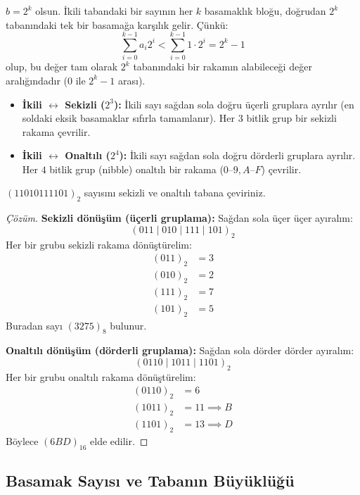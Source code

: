 $b = 2^k$ olsun. İkili tabandaki bir sayının her $k$ basamaklık bloğu, doğrudan $2^k$ tabanındaki tek bir basamağa karşılık gelir. Çünkü:
\[
\sum_{i=0}^{k-1} a_i 2^i < \sum_{i=0}^{k-1} 1 \cdot 2^i = 2^k - 1
\]
olup, bu değer tam olarak $2^k$ tabanındaki bir rakamın alabileceği değer aralığındadır ($0$ ile $2^k-1$ arası).

\begin{itemize}
    \item \textbf{İkili $\leftrightarrow$ Sekizli ($2^3$):} İkili sayı sağdan sola doğru üçerli gruplara ayrılır (en soldaki eksik basamaklar sıfırla tamamlanır). Her $3$ bitlik grup bir sekizli rakama çevrilir.
    \item \textbf{İkili $\leftrightarrow$ Onaltılı ($2^4$):} İkili sayı sağdan sola doğru dörderli gruplara ayrılır. Her $4$ bitlik grup (nibble) onaltılı bir rakama ($0\text{--}9, A\text{--}F$) çevrilir.
\end{itemize}

\begin{example}
$(11010111101)_2$ sayısını sekizli ve onaltılı tabana çeviriniz.
\end{example}

\begin{proof}[Çözüm]
\textbf{Sekizli dönüşüm (üçerli gruplama):}
Sağdan sola üçer üçer ayıralım:
\[
(011 \mid 010 \mid 111 \mid 101)_2
\]
Her bir grubu sekizli rakama dönüştürelim:
\begin{align*}
(011)_2 &= 3 \\
(010)_2 &= 2 \\
(111)_2 &= 7 \\
(101)_2 &= 5
\end{align*}
Buradan sayı $(3275)_8$ bulunur.

\textbf{Onaltılı dönüşüm (dörderli gruplama):}
Sağdan sola dörder dörder ayıralım:
\[
(0110 \mid 1011 \mid 1101)_2
\]
Her bir grubu onaltılı rakama dönüştürelim:
\begin{align*}
(0110)_2 &= 6 \\
(1011)_2 &= 11 \implies B \\
(1101)_2 &= 13 \implies D
\end{align*}
Böylece $(6BD)_{16}$ elde edilir.
\end{proof}

\subsection{Basamak Sayısı ve Tabanın Büyüklüğü}

